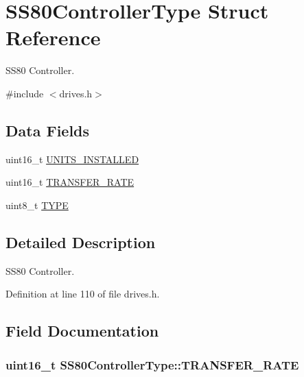 \hypertarget{structSS80ControllerType}{}\section{S\+S80\+Controller\+Type Struct Reference}
\label{structSS80ControllerType}


S\+S80 Controller.  




{\ttfamily \#include $<$drives.\+h$>$}

\subsection*{Data Fields}
\begin{DoxyCompactItemize}
\item 
uint16\+\_\+t \hyperlink{structSS80ControllerType_a0868c32b362ef2af2ac64fa16aee8aae}{U\+N\+I\+T\+S\+\_\+\+I\+N\+S\+T\+A\+L\+L\+ED}
\item 
uint16\+\_\+t \hyperlink{structSS80ControllerType_a98a3f1a7de63398531426b5781cb0090}{T\+R\+A\+N\+S\+F\+E\+R\+\_\+\+R\+A\+TE}
\item 
uint8\+\_\+t \hyperlink{structSS80ControllerType_a255739680bca0ad3b4d1346cf5017332}{T\+Y\+PE}
\end{DoxyCompactItemize}


\subsection{Detailed Description}
S\+S80 Controller. 

Definition at line 110 of file drives.\+h.



\subsection{Field Documentation}
\subsubsection[{\texorpdfstring{T\+R\+A\+N\+S\+F\+E\+R\+\_\+\+R\+A\+TE}{TRANSFER_RATE}}]{\setlength{\rightskip}{0pt plus 5cm}uint16\+\_\+t S\+S80\+Controller\+Type\+::\+T\+R\+A\+N\+S\+F\+E\+R\+\_\+\+R\+A\+TE}\hypertarget{structSS80ControllerType_a98a3f1a7de63398531426b5781cb0090}{}\label{structSS80ControllerType_a98a3f1a7de63398531426b5781cb0090}


